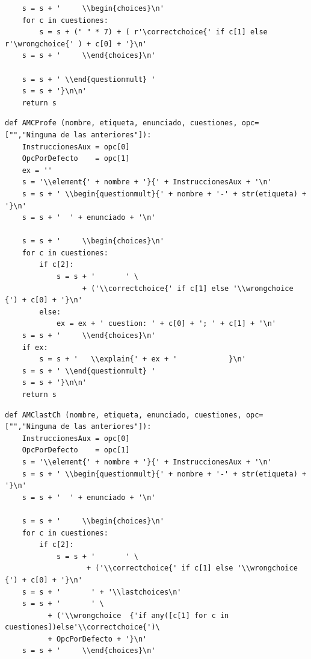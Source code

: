 \documentclass[10pt,a4paper]{report}
\begin{document}
\begin{enumerate}
\begin{verbatim}
    s = s + '     \\begin{choices}\n'
    for c in cuestiones:
        s = s + (" " * 7) + ( r'\correctchoice{' if c[1] else r'\wrongchoice{' ) + c[0] + '}\n'
    s = s + '     \\end{choices}\n'
    
    s = s + ' \\end{questionmult} '
    s = s + '}\n\n'
    return s
\end{verbatim}



\begin{verbatim}
def AMCProfe (nombre, etiqueta, enunciado, cuestiones, opc=["","Ninguna de las anteriores"]):    
    InstruccionesAux = opc[0]
    OpcPorDefecto    = opc[1]
    ex = '' 
    s = '\\element{' + nombre + '}{' + InstruccionesAux + '\n'
    s = s + ' \\begin{questionmult}{' + nombre + '-' + str(etiqueta) + '}\n'
    s = s + '  ' + enunciado + '\n'

    s = s + '     \\begin{choices}\n'
    for c in cuestiones:
        if c[2]: 
            s = s + '       ' \
                  + ('\\correctchoice{' if c[1] else '\\wrongchoice  {') + c[0] + '}\n'
        else:
            ex = ex + ' cuestion: ' + c[0] + '; ' + c[1] + '\n'
    s = s + '     \\end{choices}\n'
    if ex:
        s = s + '   \\explain{' + ex + '            }\n'     
    s = s + ' \\end{questionmult} '
    s = s + '}\n\n'
    return s
\end{verbatim}

\begin{verbatim}
def AMClastCh (nombre, etiqueta, enunciado, cuestiones, opc=["","Ninguna de las anteriores"]):    
    InstruccionesAux = opc[0]
    OpcPorDefecto    = opc[1]
    s = '\\element{' + nombre + '}{' + InstruccionesAux + '\n'
    s = s + ' \\begin{questionmult}{' + nombre + '-' + str(etiqueta) + '}\n'
    s = s + '  ' + enunciado + '\n'
    
    s = s + '     \\begin{choices}\n'
    for c in cuestiones:
        if c[2]: 
            s = s + '       ' \
                   + ('\\correctchoice{' if c[1] else '\\wrongchoice  {') + c[0] + '}\n'
    s = s + '       ' + '\\lastchoices\n'
    s = s + '       ' \
          + ('\\wrongchoice  {'if any([c[1] for c in cuestiones])else'\\correctchoice{')\
          + OpcPorDefecto + '}\n'
    s = s + '     \\end{choices}\n'
    

\end{verbatim}
\end{enumerate}
\end{document}
